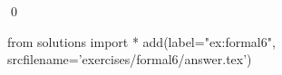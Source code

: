 
\begin{ex} 
  \label{ex:formal6}
  
  \qed
\end{ex} 
\begin{python0}
from solutions import *
add(label="ex:formal6",
    srcfilename='exercises/formal6/answer.tex') 
\end{python0}
